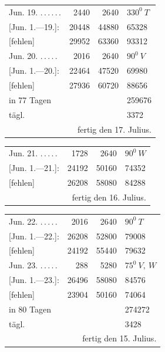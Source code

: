 \begin{center}
\begin{tabular}{@{}p{.36\linewidth}rrl@{}}
Jun. 19. \BJournalDay{♀}\nobreak\hspace{.2em}\mbox{.\,.\,.\,.\,.\,.}\hfill&2440&2640&\(\mathit{330}^0\ T\)\\
\hfill [Jun. 1.—19.]:&20448&44880&65328\\
\hfill [fehlen]&29952&63360&93312\\
Jun. 20. \BJournalDay{♄}\nobreak\hspace{.2em}\mbox{.\,.\,.\,.\,.}\hfill&2016&2640&\(\mathit{90}^0\ V\)\\
\hfill [Jun. 1.—20.]:&22464&47520&69980\\
\hfill [fehlen]&27936&60720&88656\\
\hfill in 77 Tagen&&&259676\\
\hfill tägl.&&&3372\\
\multicolumn{4}{r}{fertig den 17. Julius.}\\
\hline
\end{tabular}
\end{center}
\begin{center}
\begin{tabular}{@{}p{.36\linewidth}rrl@{}}
Jun. 21. \BJournalDay{☉}\nobreak\hspace{.2em}\mbox{.\,.\,.\,.\,.}\hfill&1728&2640&\(\mathit{90}^0\ W\)\\
\hfill [Jun. 1.—21.]:&24192&50160&74352\\
\hfill [fehlen]&26208&58080&84288\\
\multicolumn{4}{r}{fertig den 16. Julius.}\\
\hline
\end{tabular}
\end{center}
\begin{center}
\begin{tabular}{@{}p{.36\linewidth}rrl@{}}
Jun. 22. \BJournalDay{☾}\nobreak\hspace{.2em}\mbox{.\,.\,.\,.\,.}\hfill&2016&2640&\(\mathit{90}^0\ T\)\\
\hfill [Jun. 1.—22.]:&26208&52800&79008\\
\hfill [fehlen]&24192&55440&79632\\
Jun. 23. \BJournalDay{♂}\nobreak\hspace{.2em}\mbox{.\,.\,.\,.\,.}\hfill&288&5280&\(\mathit{75}^0\ V,\ W\)\\
\hfill [Jun. 1.—23.]:&26496&58080&84576\\
\hfill [fehlen]&23904&50160&74064\\
\hfill in 80 Tagen&&&274272\\
\hfill tägl.&&&3428\\
\multicolumn{4}{r}{fertig den 15. Julius.}\\
\hline
\end{tabular}
\end{center}
